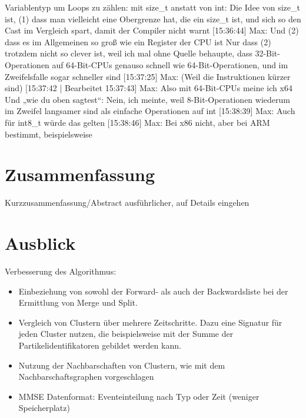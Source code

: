 Variablentyp um Loops zu zählen:
mit size\_t anstatt von int:
Die Idee von size\_t ist, (1) dass man vielleicht eine Obergrenze hat, die ein size\_t ist, und sich so den Cast im Vergleich spart, damit der Compiler nicht warnt
[15:36:44] Max: Und (2) dass es im Allgemeinen so groß wie ein Register der CPU ist
Nur dass (2) trotzdem nicht so clever ist, weil ich mal ohne Quelle behaupte, dass 32-Bit-Operationen auf 64-Bit-CPUs genauso schnell wie 64-Bit-Operationen, und im Zweifelsfalle sogar schneller sind
[15:37:25] Max: (Weil die Instruktionen kürzer sind)
[15:37:42 | Bearbeitet 15:37:43] Max: Also mit 64-Bit-CPUs meine ich x64
Und „wie du oben sagtest“: Nein, ich meinte, weil 8-Bit-Operationen wiederum im Zweifel langsamer sind als einfache Operationen auf int
[15:38:39] Max: Auch für int8\_t würde das gelten
[15:38:46] Max: Bei x86 nicht, aber bei ARM bestimmt, beispielsweise


\chapter{Zusammenfassung}
Kurzzusammenfassung/Abstract ausführlicher, auf Details eingehen

\chapter{Ausblick}
Verbesserung des Algorithmus:
\begin{itemize}
	\item Einbeziehung von sowohl der Forward- als auch der Backwardsliste bei der Ermittlung von Merge und Split.
	\item Vergleich von Clustern über mehrere Zeitschritte. Dazu eine Signatur für jeden Cluster nutzen, die beispielsweise mit der Summe der Partikelidentifikatoren gebildet werden kann.
	\item Nutzung der Nachbarschaften von Clustern, wie mit dem Nachbarschaftsgraphen vorgeschlagen
	\item MMSE Datenformat: Eventeinteilung nach Typ oder Zeit (weniger Speicherplatz)
\end{itemize}

